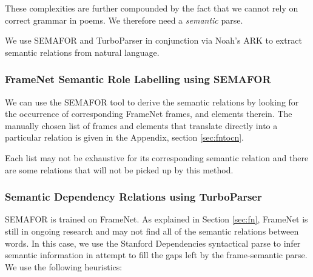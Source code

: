 These complexities are further compounded by the fact that we cannot rely on correct grammar in poems. We therefore need a \textit{semantic} parse. 

We use SEMAFOR and TurboParser in conjunction via Noah's ARK to extract semantic relations from natural language.

\subsubsection{FrameNet Semantic Role Labelling using SEMAFOR}
\label{sec:sema}

We can use the SEMAFOR tool to derive the semantic relations by looking for the occurrence of corresponding FrameNet frames, and elements therein. The manually chosen list of frames and elements that translate directly into a particular relation is given in the Appendix, section \ref{sec:fntocn}.

Each list may not be exhaustive for its corresponding semantic relation and there are some relations that will not be picked up by this method.

\subsubsection{Semantic Dependency Relations using TurboParser}
\label{sec:turbo}

SEMAFOR is trained on FrameNet. As explained in Section \ref{sec:fn}, FrameNet is still in ongoing research and may not find all of the semantic relations between words. In this case, we use the Stanford Dependencies syntactical parse to infer semantic information in attempt to fill the gaps left by the frame-semantic parse. We use the following heuristics:

